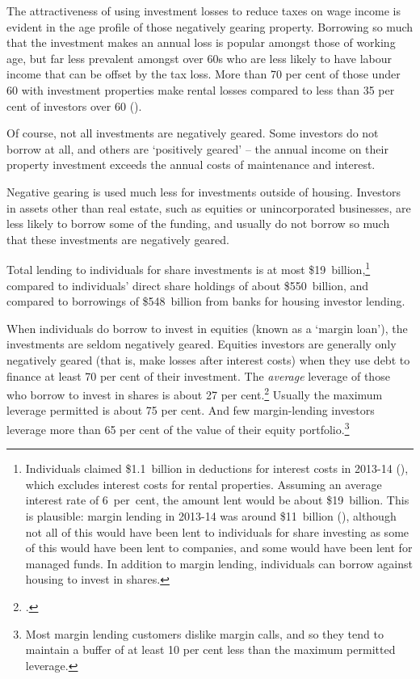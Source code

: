 The attractiveness of using investment losses to reduce taxes on wage income is evident in the age profile of those negatively gearing property. Borrowing so much that the investment makes an annual loss is popular amongst those of working age, but far less prevalent amongst over 60s who are less likely to have labour income that can be offset by the tax loss. More than 70 per cent of those under 60 with investment properties make rental losses compared to less than 35 per cent of investors over 60 ().

Of course, not all investments are negatively geared. Some investors do not borrow at all, and others are ‘positively geared’ – the annual income on their property investment exceeds the annual costs of maintenance and interest. 
  
  Negative gearing is used much less for investments outside of housing. Investors in assets other than real estate, such as equities or unincorporated businesses, are less likely to borrow some of the funding, and usually do not borrow so much that these investments are negatively geared. 

Total lending to individuals for share investments is at most \$19~billion,\footnote{Individuals claimed \$1.1~billion in deductions for interest costs in 2013-14 (\textcite[][Table 12]{ATOTaxstats201314}), which excludes interest costs for rental properties. Assuming an average interest rate of 6~per~cent, the amount lent would be about \$19~billion. This is plausible: margin lending in 2013-14 was around \$11~billion (\textcite{RBA2015StatsMarginLending}), although not all of this would have been lent to individuals for share investing as some of this would have been lent to companies, and some would have been lent for managed funds. In addition to margin lending, individuals can borrow against housing to invest in shares.}  compared to individuals’ direct share holdings of about \$550~billion,  and compared to borrowings of \$548~billion from banks for housing investor lending.  


When individuals do borrow to invest in equities (known as a ‘margin loan’), the investments are seldom negatively geared. Equities investors are generally only negatively geared (that is, make losses after interest costs) when they use debt to finance at least 70 per cent of their investment.  The \emph{average} leverage of those who borrow to invest in shares is about 27 per cent.\footcite[][Table~D2]{RBA2015StatsMarginLending} Usually the maximum leverage permitted is about 75 per cent. And few margin-lending investors leverage more than 65 per cent of the value of their equity portfolio.\footnote{Most margin lending customers dislike margin calls, and so they tend to maintain a buffer of at least 10 per cent less than the maximum permitted leverage.}


